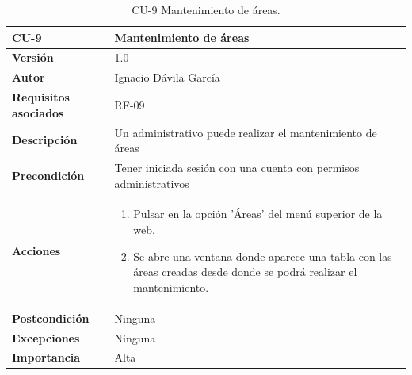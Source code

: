 \begin{table}[p]
	\centering
	\begin{tabularx}{\linewidth}{ p{} p{} }
		\toprule
		\textbf{CU-9}    & \textbf{Mantenimiento de áreas}\\
		\toprule
		\textbf{Versión}              & 1.0    \\
		\textbf{Autor}                & Ignacio Dávila García \\
		\textbf{Requisitos asociados} & RF-09 \\
		\textbf{Descripción}          & Un administrativo puede realizar el mantenimiento de áreas \\
		\textbf{Precondición}         & Tener iniciada sesión con una cuenta con permisos administrativos \\
		\textbf{Acciones}             &
		\begin{enumerate}
			\def\labelenumi{\arabic{enumi}.}
			\tightlist
			\item Pulsar en la opción 'Áreas' del menú superior de la web.
			\item Se abre una ventana donde aparece una tabla con las áreas creadas desde donde se podrá realizar el mantenimiento.
		\end{enumerate}\\
		\textbf{Postcondición}        & Ninguna \\
		\textbf{Excepciones}          & Ninguna \\
		\textbf{Importancia}          & Alta \\
		\bottomrule
	\end{tabularx}
	\caption{CU-9 Mantenimiento de áreas.}
\end{table}

